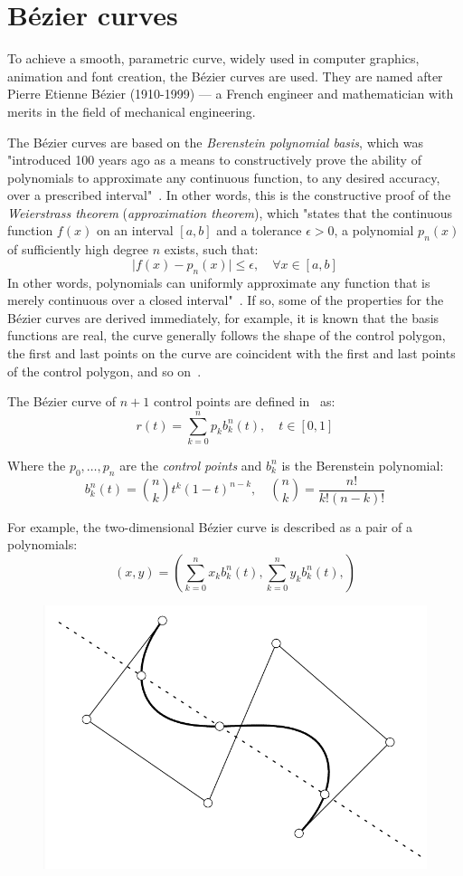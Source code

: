 \section{Bézier curves}\label{sec:bezier-curves}
To achieve a smooth, parametric curve, widely used in computer graphics, animation and font creation, the Bézier curves are used.
They are named after Pierre Etienne Bézier (1910-1999) --- a French engineer and mathematician with merits in the field of mechanical engineering.

The Bézier curves are based on the \textit{Berenstein polynomial basis}, which was "introduced 100 years ago as a means to constructively prove the ability of polynomials to approximate any continuous function, to any desired accuracy, over a prescribed interval"~\cite{farouki2012bernstein}.
In other words, this is the constructive proof of the \textit{Weierstrass theorem} (\textit{approximation theorem}), which "states that the continuous function $f(x)$ on an interval $[a, b]$ and a tolerance $\epsilon > 0$, a polynomial $p_n(x)$ of sufficiently high degree $n$ exists, such that:
\[
    \mid f(x) - p_n(x) \mid \leq \epsilon, \quad \forall x \in \left[ a,b \right]
\]
In other words, polynomials can uniformly approximate any function that is merely continuous over a closed interval"~\cite{farouki2012bernstein}.
If so, some of the properties for the Bézier curves are derived immediately, for example, it is known that the basis functions are real, the curve generally follows the shape of the control polygon, the first and last points on the curve are coincident with the first and last points of the control polygon, and so on~\cite{bezier-curves}.

The Bézier curve of $n+1$ control points are defined in~\cite{farouki2012bernstein} as:
\[
    r(t) = \sum_{k=0}^n p_k b_k^n(t),  \quad t \in [0,1]
\]

Where the $p_0,\dots,p_n$ are the \textit{control points} and $b_k^n$ is the Berenstein polynomial:
\[
    b_k^n(t) = \binom{n}{k} t^k (1-t)^{n-k}, \quad \binom{n}{k} = \frac{n!}{k!(n-k)!}
\]

For example, the two-dimensional Bézier curve is described as a pair of a polynomials:
\[
    (x,y) = \left( \sum_{k=0}^n x_{k} b_k^n(t), \sum_{k=0}^n y_{k} b_k^n(t), \right)
\]

\begin{figure}[h!]
    \centering
    \includegraphics[width=0.4\linewidth,scale=0.4]{resources/bezier-curve-example.png}
    \label{fig:bezier-example}
\end{figure}

